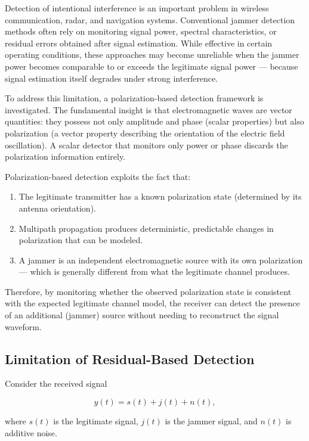 \documentclass{article}
\begin{document}
Detection of intentional interference is an important problem in wireless communication, radar, and navigation systems. Conventional jammer detection methods often rely on monitoring signal power, spectral characteristics, or residual errors obtained after signal estimation. While effective in certain operating conditions, these approaches may become unreliable when the jammer power becomes comparable to or exceeds the legitimate signal power — because signal estimation itself degrades under strong interference.

To address this limitation, a polarization-based detection framework is investigated. The fundamental insight is that electromagnetic waves are vector quantities: they possess not only amplitude and phase (scalar properties) but also polarization (a vector property describing the orientation of the electric field oscillation). A scalar detector that monitors only power or phase discards the polarization information entirely.

Polarization-based detection exploits the fact that:
\begin{enumerate}
\item The legitimate transmitter has a known polarization state (determined by its antenna orientation).
\item Multipath propagation produces deterministic, predictable changes in polarization that can be modeled.
\item A jammer is an independent electromagnetic source with its own polarization — which is generally different from what the legitimate channel produces.
\end{enumerate}

Therefore, by monitoring whether the observed polarization state is consistent with the expected legitimate channel model, the receiver can detect the presence of an additional (jammer) source without needing to reconstruct the signal waveform.

\subsection{Limitation of Residual-Based Detection}

Consider the received signal

\begin{equation}
y(t)=s(t)+j(t)+n(t),
\end{equation}

where $s(t)$ is the legitimate signal, $j(t)$ is the jammer signal, and $n(t)$ is additive noise.
\end{document}
